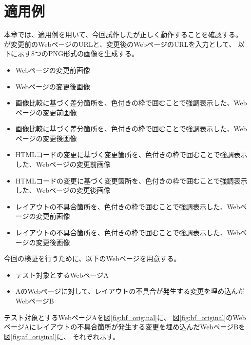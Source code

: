 \chapter{適用例}\label{cha:Indication}
本章では、適用例を用いて、今回試作した\toolName が正しく動作することを確認する。
\toolName が変更前のWebページのURLと、変更後のWebページのURLを入力として、
以下に示す8つのPNG形式の画像を生成する。
\begin{itemize}
    \item Webページの変更前画像
    \item Webページの変更後画像
    \item 画像比較に基づく差分箇所を、色付きの枠で囲むことで強調表示した、Webページの変更前画像
    \item 画像比較に基づく差分箇所を、色付きの枠で囲むことで強調表示した、Webページの変更後画像
    \item HTMLコードの変更に基づく変更箇所を、色付きの枠で囲むことで強調表示した、Webページの変更前画像
    \item HTMLコードの変更に基づく変更箇所を、色付きの枠で囲むことで強調表示した、Webページの変更後画像
    \item レイアウトの不具合箇所を、色付きの枠で囲むことで強調表示した、Webページの変更前画像
    \item レイアウトの不具合箇所を、色付きの枠で囲むことで強調表示した、Webページの変更後画像
\end{itemize}
今回の検証を行うために、以下のWebページを用意する。
\begin{itemize}
    \setlength{\itemsep}{0pt}
          \setlength{\parsep}{0pt}
    \item テスト対象とするWebページA\label{item: ex1_bf}
    \item AのWebページに対して、レイアウトの不具合が発生する変更を埋め込んだWebページB\label{item: ex1_af}
\end{itemize}
テスト対象とするWebページAを図\ref{fig:bf_original}に、
図\ref{fig:bf_original}のWebページAにレイアウトの不具合箇所が発生する変更を埋め込んだWebページBを図\ref{fig:af_original}に、
それぞれ示す。

